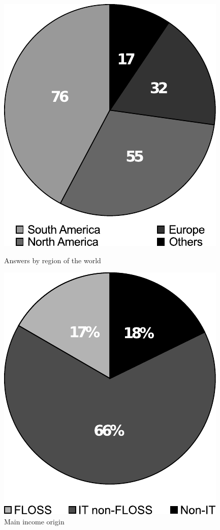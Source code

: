 \documentclass[lnbip]{svmultln}
\begin{document}
\begin{figure}[htb]
  \begin{minipage}[t]{0.5\linewidth}
    \includegraphics[scale=0.8]{floss-world.pdf}
    \caption{Answers by region of the world}
    \label{fig:floss-world}
  \end{minipage}
  \begin{minipage}[t]{0.5\linewidth}
    \includegraphics[scale=0.8]{floss-income.pdf}
    \caption{Main income origin}
    \label{fig:floss-income}
  \end{minipage}
\end{figure}
\end{document}
